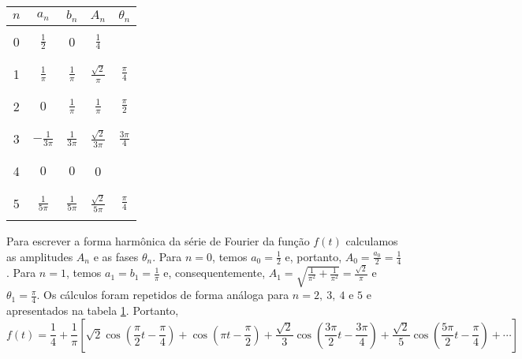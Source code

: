 \begin{ex}
\begin{table}[ht] 
\begin{center}
   \begin{tabular}{|c|c|c|c|c|}
   \hline
   $n$ & $a_n$ & $b_n$ & $A_n$&$\theta_n  $ \\
   \hline
   &&&&\\
   0& $\frac{1}{2}$ & 0 & $\frac{1}{4}$ & \\
   &&&&\\
   \hline
   &&&&\\
   1&$\frac{1}{\pi}$ & $\frac{1}{\pi}$ & $\frac{\sqrt{2}}{\pi}$ & $\frac{\pi}{4}$ \\
		&&&&\\
		\hline
		 &&&&\\
   2&$0$&$\frac{1}{\pi}$ & $\frac{1}{\pi}$ & $\frac{\pi}{2}$  \\
		&&&&\\
		\hline
		 &&&&\\
   3&$-\frac{1}{3\pi}$&$\frac{1}{3\pi}$& $\frac{\sqrt{2}}{3\pi}$ & $\frac{3\pi}{4}$\\
		&&&&\\
		\hline
		 &&&&\\
   4&$0$&$0$&0&\\
		&&&&\\
		\hline
		&&&&\\
		5&$\frac{1}{5\pi}$&$\frac{1}{5\pi}$&$\frac{\sqrt{2}}{5\pi}$&$\frac{\pi}{4}$ \\
		&&&&\\
		\hline
 \end{tabular}
 \caption{\label{tab_exponential_form}}
   \end{center}
\end{table}


Para escrever a forma harmônica da série de Fourier da função $f(t)$ calculamos as amplitudes $A_n$ e as fases $\theta_n$. Para $n=0$, temos $a_0=\frac{1}{2}$ e, portanto, $A_0=\frac{a_0}{2}=\frac{1}{4}$. Para $n=1$, temos $a_1=b_1=\frac{1}{\pi}$ e, consequentemente, $A_1=\sqrt{\frac{1}{\pi^2}+\frac{1}{\pi^2}}=\frac{\sqrt{2}}{\pi}$ e $\theta_1=\frac{\pi}{4}$. Os cálculos foram repetidos de forma análoga para $n=2,\ 3,\ 4$ e $5$ e apresentados na tabela \ref{tab_exponential_form}. Portanto,
$$
f(t)=\frac{1}{4}+\frac{1}{\pi}\left[\sqrt{2}\cos\left(\frac{\pi }{2} t-\frac{\pi}{4}\right)+\cos\left(\pi  t-\frac{\pi}{2}\right)+\frac{\sqrt{2}}{3}\cos\left(\frac{3 \pi }{2} t-\frac{3\pi}{4}\right)+\frac{\sqrt{2}}{5}\cos\left(\frac{5 \pi }{2} t-\frac{\pi }{4}\right)+\cdots   \right]
$$

\end{ex}

